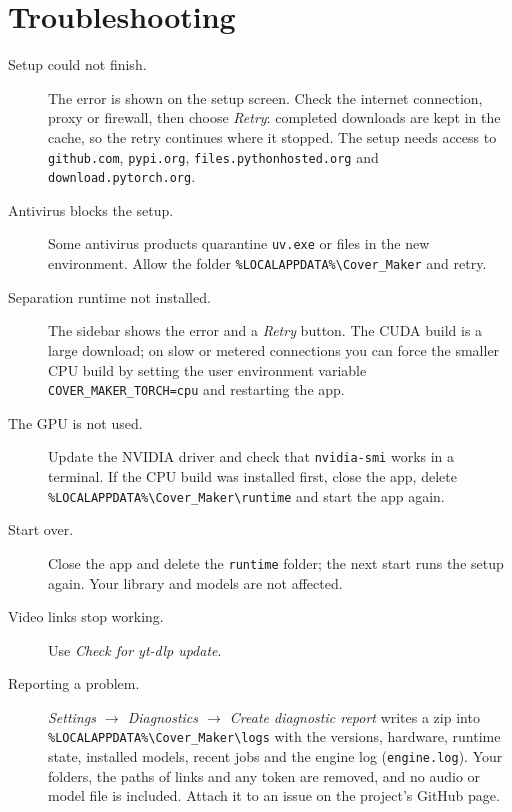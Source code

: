 \documentclass{covermaker}
\begin{document}
\chapter{Troubleshooting}
\begin{description}
  \item[Setup could not finish.] The error is shown on the setup screen. Check
  the internet connection, proxy or firewall, then choose \emph{Retry}:
  completed downloads are kept in the cache, so the retry continues where it
  stopped. The setup needs access to \texttt{github.com},
  \texttt{pypi.org}, \texttt{files.pythonhosted.org} and
  \texttt{download.pytorch.org}.
  \item[Antivirus blocks the setup.] Some antivirus products quarantine
  \texttt{uv.exe} or files in the new environment. Allow the folder
  \texttt{\%LOCALAPPDATA\%\textbackslash Cover\_Maker} and retry.
  \item[Separation runtime not installed.] The sidebar shows the error and a
  \emph{Retry} button. The CUDA build is a large download; on slow or metered
  connections you can force the smaller CPU build by setting the user
  environment variable \texttt{COVER\_MAKER\_TORCH=cpu} and restarting the app.
  \item[The GPU is not used.] Update the NVIDIA driver and check that
  \texttt{nvidia-smi} works in a terminal. If the CPU build was installed
  first, close the app, delete
  \texttt{\%LOCALAPPDATA\%\textbackslash Cover\_Maker\textbackslash runtime} and
  start the app again.
  \item[Start over.] Close the app and delete the \texttt{runtime} folder; the
  next start runs the setup again. Your library and models are not affected.
  \item[Video links stop working.] Use \emph{Check for yt-dlp update}.
  \item[Reporting a problem.] \emph{Settings $\rightarrow$ Diagnostics
  $\rightarrow$ Create diagnostic report} writes a zip into
  \texttt{\%LOCALAPPDATA\%\textbackslash Cover\_Maker\textbackslash logs}
  with the versions, hardware, runtime state, installed models, recent jobs
  and the engine log (\texttt{engine.log}). Your folders, the paths of links
  and any token are removed, and no audio or model file is included. Attach
  it to an issue on the project's GitHub page.
\end{description}
\end{document}
